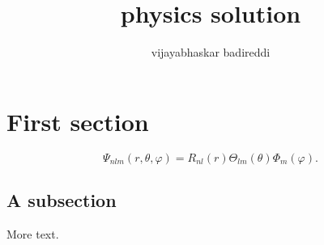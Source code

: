 \documentclass[12pt]{article}
\title{physics solution}
\author{vijayabhaskar badireddi}
\begin{document}

\section*{First section}
\[\Psi_{nlm}(r,\theta,\varphi)=R_{nl}(r)\Theta_{lm}(\theta)\Phi_m(\varphi).\]

\subsection*{A subsection}

More text.
\end{document}
